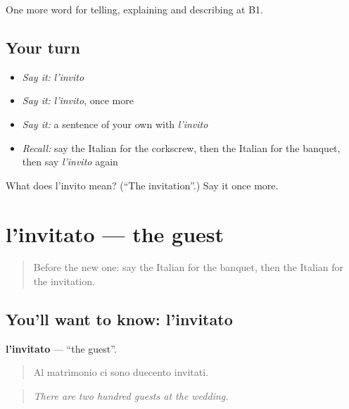 \begin{grammarlens}[title={What you've built}]
One more word for telling, explaining and describing at B1.
\end{grammarlens}

\subsection*{Your turn}
\begin{itemize}
\raggedright
  \item \emph{Say it:} \emph{l'invito}
  \item \emph{Say it:} \emph{l'invito}, once more
  \item \emph{Say it:} a sentence of your own with \emph{l'invito}
  \item \emph{Recall:} say the Italian for the corkscrew, then the Italian for the banquet, then say \emph{l'invito} again
\end{itemize}

\begin{tcolorbox}[breakable,colback=teal!4,colframe=teal!35!black,title={Before you move on}]
What does l'invito mean? (\textquotedblleft{}The invitation\textquotedblright{}.) Say it once more.
\end{tcolorbox}
\section[l'invitato]{l'invitato — the guest}

\label{lesson:IT-C318-invitato}



\begin{quote}
Before the new one: say the Italian for the banquet, then the Italian for the invitation.
\end{quote}

\subsection*{You'll want to know: l'invitato}
\textbf{l'invitato} — \textquotedblleft{}the guest\textquotedblright{}.

\begin{quote}
Al matrimonio ci sono duecento invitati.
\end{quote}

\begin{quote}
\emph{There are two hundred guests at the wedding.}
\end{quote}

